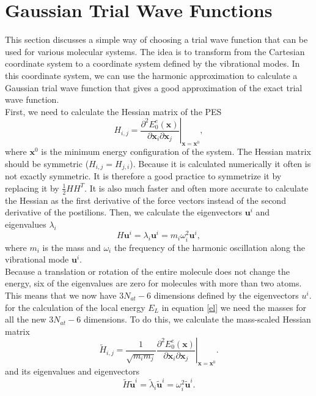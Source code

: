 \documentclass [12pt]{report}
\begin{document}
\section{Gaussian Trial Wave Functions}
This section discusses a simple way of choosing a trial wave function that can be used for various molecular systems. The idea is to transform from the Cartesian coordinate system  to a coordinate system defined by the vibrational modes. In this coordinate system, we can use the harmonic approximation to calculate a Gaussian trial wave function that gives a good approximation of the exact trial wave function.\\
First, we need to calculate the Hessian matrix of the PES
\begin{equation}
H_{i,j} = \left. \frac{\partial^2 E_0^e(\bm{x})}{\partial \bm{x}_i \partial \bm{x}_j }\right|_{\bm{x} = \bm{x}^0},
\end{equation}
where $\bm{x}^0$ is the minimum energy configuration of the system. The Hessian matrix should be symmetric ($H_{i,j} = H_{j,i}$). Because it is calculated numerically it often is not exactly symmetric. It is therefore a good practice to symmetrize it by replacing it by $\frac{1}{2} H H^T$. It is also much faster and often more accurate to calculate the Hessian as the first derivative of the force vectors instead of the second derivative of the postilions. 
Then, we calculate the eigenvectors $\bm{u}^i$ and  eigenvalues $\lambda_i$
\begin{equation} \label{eigs}
H \bm{u}^i = \lambda_i \bm{u}^i = m_i \omega_i^2 \bm{u}^i,
\end{equation}
where $m_i$ is the mass and $\omega_i$ the frequency of the harmonic oscillation along the vibrational mode $\bm{u}^i$.\\
Because a translation or rotation of the entire molecule does not change the energy, six of the eigenvalues are zero for molecules with more than two atoms. This means that we now have $3 N_{at} - 6$ dimensions defined by the eigenvectors $u^i$.\\
for the calculation of the local energy $E_L$ in equation \eqref{el} we need the masses for all the new $3 N_{at} - 6$ dimensions. To do this, we calculate the mass-scaled Hessian matrix
\begin{equation}
\tilde{H}_{i,j} = \left. \frac{1}{\sqrt{m_i m_j}}\frac{\partial^2 E_0^e(\bm{x})}{ \partial \bm{x}_i \partial \bm{x}_j }\right|_{\bm{x} = \bm{x}^0}.
\end{equation}
and its eigenvalues and eigenvectors
\begin{equation}
\tilde{H} \bm{\tilde{u}}^i = \tilde{\lambda}_i \bm{\tilde{u}}^i = \omega_i^2 \bm{\tilde{u}}^i.
\end{equation}
\end{document}
